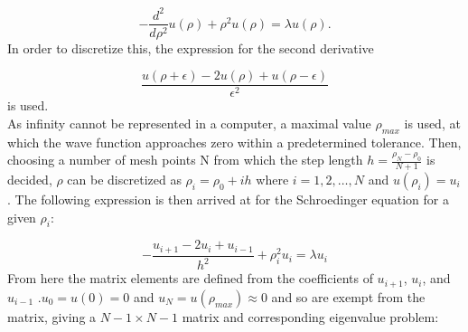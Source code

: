 \documentclass[10pt,a4paper]{article}
\begin{document}
\begin{equation*}
  -\frac{d^2}{d\rho^2} u(\rho) + \rho^2u(\rho)  = \lambda u(\rho) .
\end{equation*}
In order to discretize this, the expression for the second derivative

\begin{equation*}
  \frac{u(\rho+\epsilon) -2u(\rho) +u(\rho-\epsilon)}{\epsilon^2}
\end{equation*}
is used.\\As infinity cannot be represented in a computer, a maximal value $\rho_{max}$ is used, at which the wave function approaches zero within a predetermined tolerance. Then, choosing a number of mesh points N from which the step length $h=\frac{\rho_N-\rho_0 }{N+1}$ is decided, $\rho$ can be discretized as $\rho_i= \rho_0 + ih$ where $i=1,2,\dots , N$ and $u(\rho_i)=u_i$. The following expression is then arrived at for the Schroedinger equation for a given $\rho_i$:

\begin{equation*}
-\frac{u_{i+1} -2u_i +u_{i-1}}{h^2}+\rho_i^2u_i= \lambda u_i
\end{equation*}
From here the matrix elements are defined from the coefficients of $u_{i+1}$, $u_{i}$, and $u_{i-1}$ .$u_0 = u(0)= 0$ and $u_N = u(\rho_{max}) \approx 0$ and so are exempt from the matrix, giving a $N-1 \times N-1$ matrix and corresponding eigenvalue problem:
\end{document}
